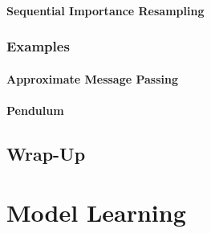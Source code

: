 			\subsubsection{Sequential Importance Resampling} %

		\subsection{Examples} %

			\subsubsection{Approximate Message Passing} %

			\subsubsection{Pendulum} %

	\section{Wrap-Up} %

\chapter{Model Learning}
	\label{c:modelLearning}

